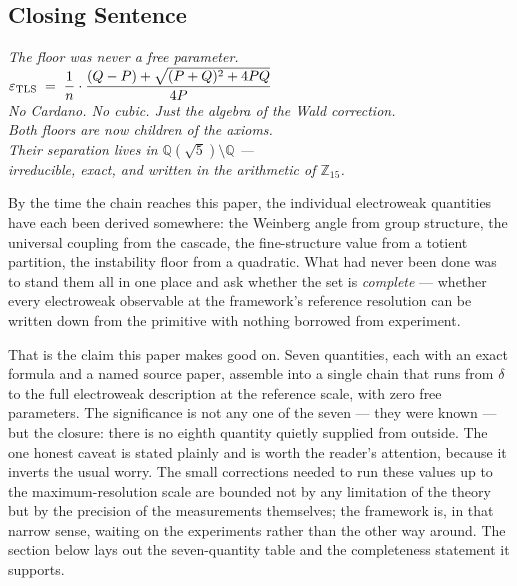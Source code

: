 \documentclass[12pt, a4paper]{article}
\begin{document}
\subsection{Closing Sentence}

\bigskip
\begin{center}
\textit{%
  The floor was never a free parameter.\\[0.4em]
  $\displaystyle
    \varepsilon_{\rm TLS}
    \;=\;
    \frac{1}{n}\cdot
    \frac{(Q - P)
          + \sqrt{(P+Q)^2 + 4PQ}}
         {4P}$\\[0.5em]
  No Cardano. No cubic. Just the algebra of the Wald correction.\\[0.3em]
  Both floors are now children of the axioms.\\
  Their separation lives in $\mathbb{Q}(\sqrt{5})\setminus\mathbb{Q}$ ---\\
  irreducible, exact, and written in the arithmetic of $\mathbb{Z}_{15}$.
}
\end{center}



\newpage

By the time the chain reaches this paper, the individual electroweak
quantities have each been derived somewhere: the Weinberg angle from group
structure, the universal coupling from the cascade, the fine-structure value
from a totient partition, the instability floor from a quadratic. What had
never been done was to stand them all in one place and ask whether the set is
\emph{complete} --- whether every electroweak observable at the framework's
reference resolution can be written down from the primitive with nothing
borrowed from experiment.

That is the claim this paper makes good on. Seven quantities, each with an
exact formula and a named source paper, assemble into a single chain that runs
from $\delta$ to the full electroweak description at the reference scale, with
zero free parameters. The significance is not any one of the seven --- they
were known --- but the closure: there is no eighth quantity quietly supplied
from outside. The one honest caveat is stated plainly and is worth the
reader's attention, because it inverts the usual worry. The small corrections
needed to run these values up to the maximum-resolution scale are bounded not
by any limitation of the theory but by the precision of the measurements
themselves; the framework is, in that narrow sense, waiting on the
experiments rather than the other way around. The section below lays out the
seven-quantity table and the completeness statement it supports.
\end{document}

